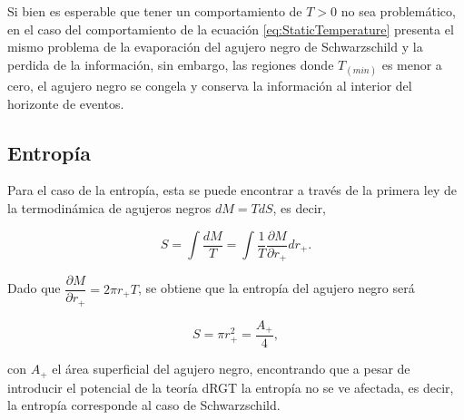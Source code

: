 Si bien es esperable que tener un comportamiento de $T>0$ no sea problemático, en el caso del comportamiento de la ecuación \eqref{eq:StaticTemperature} presenta el mismo problema de la evaporación del agujero negro de Schwarzschild y la perdida de la información, sin embargo, las regiones donde $T_{(min)}$ es menor a cero, el agujero negro se congela y conserva la información al interior del horizonte de eventos.

\subsection{Entropía}

Para el caso de la entropía, esta se puede encontrar a través de la primera ley de la termodinámica de agujeros negros \cite{ToolKit, AClassOfBlackHoles} $dM=TdS$, es decir,

\begin{equation}
    S=\int \dfrac{dM}{T}=\int \dfrac{1}{T}\dfrac{\partial M}{\partial r_+}dr_+.
\end{equation}

Dado que $\dfrac{\partial M}{\partial r_+}=2\pi r_+T$, se obtiene que la entropía del agujero negro será 

\begin{equation}
    S=\pi r_+^2=\dfrac{A_+}{4},
\end{equation}

con $A_+$ el área superficial del agujero negro, encontrando que a pesar de introducir el potencial de la teoría dRGT la entropía no se ve afectada, es decir, la entropía corresponde al caso de Schwarzschild. 

